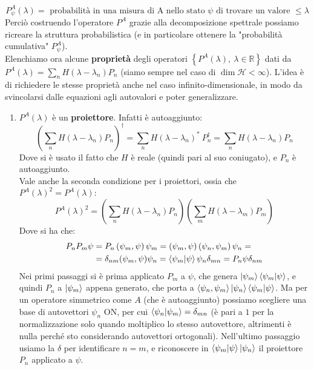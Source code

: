 \[
P_\psi^A\left(\lambda\right)=\text{ probabilità in una misura di A nello stato $\psi$  di trovare un valore }\leq \lambda 
\]
Perciò costruendo l'operatore $P^A$ grazie alla decomposizione spettrale possiamo ricreare la struttura probabilistica (e in particolare ottenere la "probabilità cumulativa" $P^A_\psi$).\\
Elenchiamo ora alcune \textbf{proprietà} degli operatori $\left\{P^A\left(\lambda\right),\ \lambda\in\mathbb{R}\right\}$ dati da $P^A(\lambda) = \sum_n H(\lambda-\lambda_n)P_n$
(siamo sempre nel caso di $\dim{\mathcal{H}}<\infty$). L'idea è di richiedere le stesse proprietà anche nel caso infinito-dimensionale, in modo da svincolarsi dalle equazioni agli autovalori e poter generalizzare.
\begin{enumerate}
    \item $P^A(\lambda)$ è un \textbf{proiettore}. Infatti è autoaggiunto:
    \[
	\left(\sum_{n}{H\left(\lambda-\lambda_n\right)P_n}\right)^\dag=\sum_{n}{H\left(\lambda-\lambda_n\right)^\ast\ P_n^\dag}=\sum_{n}{H\left(\lambda-\lambda_n\right)P_n}
	\]
	Dove si è usato il fatto che $H$ è reale (quindi pari al suo coniugato), e $P_n$ è autoaggiunto.\\
	Vale anche la seconda condizione per i proiettori, ossia che $P^A(\lambda)^2 = P^A(\lambda)$:
	\begin{equation}
	P^A\left(\lambda\right)^2
	=\left(\sum_{n}{H\left(\lambda-\lambda_n\right)P_n}\right)\left(\sum_{m}{H\left(\lambda-\lambda_m\right)P_m}\right)
	\label{eqn:PAquadro}
	\end{equation}
	Dove si ha che:
	\begin{align*}
	P_nP_m\psi&=P_n\left(\psi_m,\psi\right)\psi_m =\left(\psi_m,\psi\right)\left(\psi_n,\psi_m\right)\psi_n =\\
	&= \delta_{nm}(\psi_m, \psi) \psi_n = 
	\braket{\psi_m | \psi} \psi_n \delta_{mn} = 
	P_n\psi \delta_{nm}
	\end{align*}
	Nei primi passaggi si è prima applicato $P_m$ a $\psi$, che genera $\ket{\psi_m}\braket{\psi_m|\psi}$, e quindi $P_n$ a $\ket{\psi_m}$ appena generato, che porta a $\braket{\psi_n, \psi_m}\ket{\psi_n} \braket{\psi_m|\psi}$. Ma per un operatore simmetrico come $A$ (che è autoaggiunto) possiamo scegliere una base di autovettori $\psi_n$ ON, per cui $\braket{\psi_n|\psi_m} = \delta_{mn}$ (è pari a $1$ per la normalizzazione solo quando moltiplico lo stesso autovettore, altrimenti è nulla perché sto considerando autovettori ortogonali). Nell'ultimo passaggio usiamo la $\delta$ per identificare $n=m$, e riconoscere in $\braket{\psi_m | \psi}\ket{\psi_n}$ il proiettore $P_n$ applicato a $\psi$.\\

\end{enumerate}

